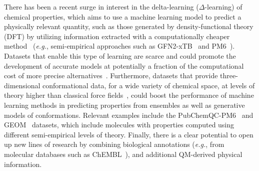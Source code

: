 There has been a recent surge in interest in the delta-learning ($\Delta$-learning) of chemical properties, which aims to use a machine learning model to predict a physically relevant quantity, such as those generated by density-functional theory (DFT) by utilizing information extracted with a computationally cheaper method~\cite{qiao2020orbnet, smith2020ani} (\textit{e.g.}, semi-empirical approaches such as GFN2-xTB~\cite{grimme2017robust, bannwarth2019gfn2, pracht2019robust, grimme2019exploration, bannwarth2020extended} and PM6~\cite{rezac2009semiempirical}). Datasets that enable this type of learning are scarce and could promote the development of accurate models at potentially a fraction of the computational cost of more precise alternatives~\cite{folmsbee2021assessing}. Furthermore, datasets that provide three-dimensional conformational data, for a wide variety of chemical space, at levels of theory higher than classical force fields~\cite{bolton2011pubchem3d, axelrod2020geom}, could boost the performance of machine learning methods in predicting properties from ensembles as well as generative models of conformations. Relevant examples include the PubChemQC-PM6~\cite{nakata2020pubchemqc} and GEOM~\cite{axelrod2020geom} datasets, which include molecules with properties computed using different semi-empirical levels of theory. Finally, there is a clear potential to open up new lines of research by combining biological annotations (\textit{e.g.}, from molecular databases such as ChEMBL~\cite{mendez2019chembl}), and additional QM-derived physical information.

